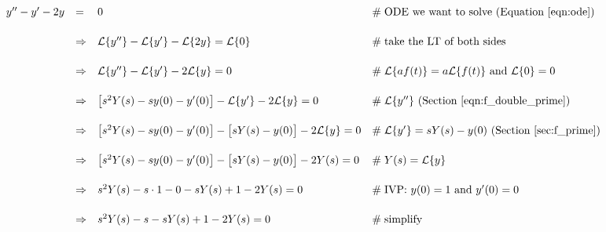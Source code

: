 \documentclass{article}
\theoremstyle{definition}
\begin{document}
\bigskip
\begin{equation*}
\begin{array}{lllll}
y^{\prime \prime} - y^\prime -2y                                                                                     
&=& 0                                                                                                                                                                        &\mathrel{\#} \text{ODE we want to solve (Equation \ref{eqn:ode}})                                      \\
[15pt]
 &\Rightarrow& \mathcal{L}\{y^{\prime \prime}\} - \mathcal{L}\{y^\prime\} -\mathcal{L}\{2y\}  = \mathcal{L}\{0\}      &\mathrel{\#} \text{take the LT of both sides}                                                                          \\
[15pt]
&\Rightarrow& \mathcal{L}\{y^{\prime \prime}\} - \mathcal{L}\{y^\prime\} - 2\mathcal{L}\{y\}                 = 0             &\mathrel{\#} \text{$\mathcal{L}\{a f(t) \} = a \mathcal{L}\{f(t)\}$ and $\mathcal{L}\{0\} = 0$}  \\
[15pt]
&\Rightarrow& \big [ s^2 Y(s) - s y(0) - y^\prime (0) \big ] - \mathcal{L}\{y^\prime\} - 2\mathcal{L}\{y\} = 0             &\mathrel{\#} \text{$\mathcal{L}\{y^{\prime \prime}\}$ (Section \ref{eqn:f_double_prime})}    \\
[15pt]
&\Rightarrow&  \big [ s^2 Y(s) - s y(0) - y^\prime (0) \big ] - \big [ s Y(s) - y(0) \big ]- 2\mathcal{L}\{y\} = 0             &\mathrel{\#} \text{$\mathcal{L}\{y^\prime\} = sY(s) - y(0)$ (Section \ref{sec:f_prime})}        \\
[15pt]
&\Rightarrow&  \big [ s^2 Y(s) - s y(0) - y^\prime (0) \big ] - \big [ s Y(s) - y(0) \big ]-  2 Y(s)                 = 0            &\mathrel{\#} Y(s) = \mathcal{L}\{y\}                                                                                         \\
[15pt]
&\Rightarrow&  s^2 Y(s) -s \cdot 1 - 0 - sY(s) + 1 - 2 Y(s)                                                                     = 0            &\mathrel{\#} \text{IVP: $y(0) = 1$ and $y^\prime (0) = 0$}                                                     \\
[15pt]
&\Rightarrow&  s^2 Y(s) -s  - sY(s) + 1 -2 Y(s)                                                                                      = 0             &\mathrel{\#} \text{simplify}                                                                                                     \\

\end{array}
\end{equation*}
\end{document}
